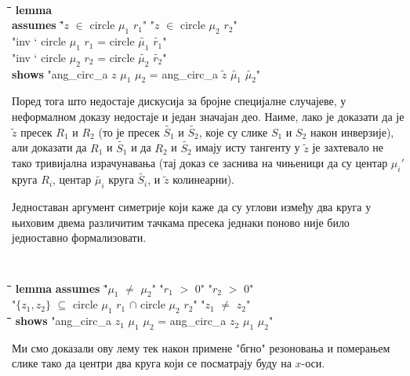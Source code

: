 {\tt
\begin{tabbing}
\hspace{5mm}\=\hspace{5mm}\=\hspace{5mm}\=\hspace{5mm}\=\hspace{5mm}\=\kill
\textbf{lemma} \\
 \> \textbf{assumes} \= "$z$ $\in$ circle $\mu_1$ $r_1$" "$z$ $\in$ circle $\mu_2$ $r_2$"\\
  \>               \> "inv ` circle $\mu_1$ $r_1$ = circle $\tilde{\mu_1}$ $\tilde{r_1}$"   \\
  \>               \> "inv ` circle $\mu_2$ $r_2$ = circle $\tilde{\mu_2}$ $\tilde{r_2}$"\\
  \> \textbf{shows} "ang\_circ\_a $z$ $\mu_1$ $\mu_2$ = ang\_circ\_a $\tilde{z}$ $\tilde{\mu_1}$ $\tilde{\mu_2}$"
\end{tabbing}
}

Поред тога што недостаје дискусија за бројне специјалне случајеве, у
неформалном доказу недостаје и један значајан део.  Наиме, лако је
доказати да је $\tilde{z}$ пресек $R_1$ и $R_2$ (то је пресек
$\tilde{S_1}$ и $\tilde{S_2}$, које су слике $S_1$ и $S_2$ након
инверзије), али доказати да $R_1$ и $\tilde{S_1}$ и да $R_2$ и
$\tilde{S_2}$ имају исту тангенту у $\tilde{z}$ је захтевало не тако
тривијална израчунавања (тај доказ се заснива на чињеници да су центар
$\mu_i'$ круга $R_i$, центар $\tilde{\mu_i}$ круга $\tilde{S_i}$, и
$\tilde{z}$ колинеарни).

Једноставан аргумент симетрије који каже да су углови између два круга
у њиховим двема различитим тачкама пресека једнаки поново није било
једноставно формализовати.
{\tt
  \begin{tabbing}
    \hspace{5mm}\=\hspace{5mm}\=\hspace{5mm}\=\hspace{5mm}\=\hspace{5mm}\=\kill
\textbf{lemma} \textbf{assumes} \="$\mu_1$ $\neq$ $\mu_2$" "$r_1$ $>$ 0" "$r_2$ $>$ 0"\\
\>"$\{z_1, z_2\}$ $\subseteq$ circle $\mu_1$ $r_1$ $\cap$ circle $\mu_2$ $r_2$" "$z_1$ $\neq$ $z_2$" \\
    \hspace{5mm}\=\hspace{5mm}\=\hspace{5mm}\=\hspace{5mm}\=\hspace{5mm}\=\kill
  \> \textbf{shows} "ang\_circ\_a $z_1$ $\mu_1$ $\mu_2$ = ang\_circ\_a $z_2$ $\mu_1$ $\mu_2$"
  \end{tabbing}
}
\noindent Ми смо доказали ову лему тек након примене "бгно" резоновања
и померањем слике тако да центри два круга који се посматрају буду на
$x$-оси.

